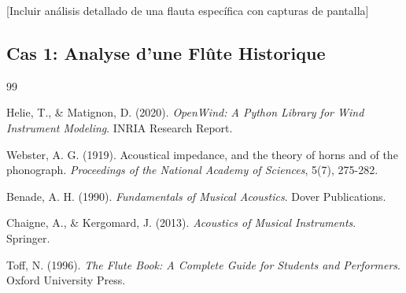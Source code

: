 \documentclass[12pt,a4paper,twocolumn]{article}
\begin{document}
[Incluir análisis detallado de una flauta específica con capturas de pantalla]

\subsection{Cas 1: Analyse d'une Flûte Historique}

\begin{thebibliography}{99}

Helie, T., \& Matignon, D. (2020).
\textit{OpenWind: A Python Library for Wind Instrument Modeling}.
INRIA Research Report.

Webster, A. G. (1919).
Acoustical impedance, and the theory of horns and of the phonograph.
\textit{Proceedings of the National Academy of Sciences}, 5(7), 275-282.

Benade, A. H. (1990).
\textit{Fundamentals of Musical Acoustics}.
Dover Publications.

Chaigne, A., \& Kergomard, J. (2013).
\textit{Acoustics of Musical Instruments}.
Springer.

Toff, N. (1996).
\textit{The Flute Book: A Complete Guide for Students and Performers}.
Oxford University Press.

\end{thebibliography}
\end{document}
